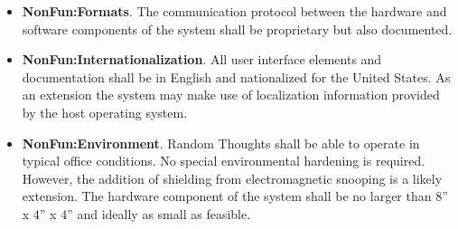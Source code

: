 \begin{itemize}
\item \textbf{NonFun:Formats}. The communication protocol between the hardware and software
  components of the system shall be proprietary but also documented.

\item \textbf{NonFun:Internationalization}. All user interface elements and documentation shall
  be in English and nationalized for the United States. As an extension the system may make use
  of localization information provided by the host operating system.

\item \textbf{NonFun:Environment}. Random Thoughts shall be able to operate in typical office
  conditions. No special environmental hardening is required. However, the addition of shielding
  from electromagnetic snooping is a likely extension. The hardware component of the system
  shall be no larger than 8'' x 4'' x 4'' and ideally as small as feasible.

\end{itemize}